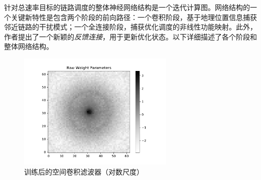\documentclass[UTF8, 12pt]{article}
\numberwithin{figure}{section}
\begin{document}
针对总速率目标的链路调度的整体神经网络结构是一个迭代计算图。网络结构的一个关键新特性是包含两个阶段的前向路径：一个卷积阶段，基于地理位置信息捕获邻近链路的干扰模式；一个全连接阶段，捕获优化调度的非线性功能映射。此外，作者提出了一个新颖的\emph{反馈连接}，用于更新优化状态。以下详细描述了各个阶段和整体网络结构。
\begin{figure}[htbp]
  \centering
  \includegraphics[width=7.5cm]{fig/ConvFilter}
  \caption{训练后的空间卷积滤波器（对数尺度）}
  \label{fig:convfilter}
  \end{figure}
  
\end{document}
